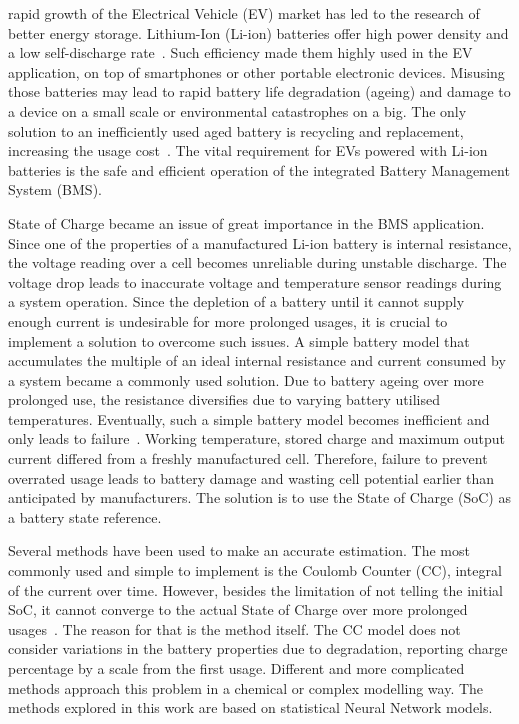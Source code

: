  rapid growth of the Electrical Vehicle (EV) market has led to the research of better energy storage.
Lithium-Ion (Li-ion) batteries offer high power density and a low self-discharge rate~\cite{han_review, en13082106}.
Such efficiency made them highly used in the EV application, on top of smartphones or other portable electronic devices.
Misusing those batteries may lead to rapid battery life degradation (ageing) and damage to a device on a small scale or environmental catastrophes on a big.
The only solution to an inefficiently used aged battery is recycling and replacement, increasing the usage cost~\cite{skeete_beyond_2020}.
The vital requirement for EVs powered with Li-ion batteries is the safe and efficient operation of the integrated Battery Management System (BMS).

%
%
State of Charge became an issue of great importance in the BMS application.
Since one of the properties of a manufactured Li-ion battery is internal resistance, the voltage reading over a cell becomes unreliable during unstable discharge.
The voltage drop leads to inaccurate voltage and temperature sensor readings during a system operation.
Since the depletion of a battery until it cannot supply enough current is undesirable for more prolonged usages, it is crucial to implement a solution to overcome such issues.
A simple battery model that accumulates the multiple of an ideal internal resistance and current consumed by a system became a commonly used solution.
Due to battery ageing over more prolonged use, the resistance diversifies due to varying battery utilised temperatures.
Eventually, such a simple battery model becomes inefficient and only leads to failure~\cite{fenrg.2019.00065}.
Working temperature, stored charge and maximum output current differed from a freshly manufactured cell.
Therefore, failure to prevent overrated usage leads to battery damage and wasting cell potential earlier than anticipated by manufacturers.
The solution is to use the State of Charge (SoC) as a battery state reference.

%
%
Several methods have been used to make an accurate estimation.
The most commonly used and simple to implement is the Coulomb Counter (CC), integral of the current over time.
However, besides the limitation of not telling the initial SoC, it cannot converge to the actual State of Charge over more prolonged usages~\cite{ng_enhanced_2009}.
The reason for that is the method itself.
The CC model does not consider variations in the battery properties due to degradation, reporting charge percentage by a scale from the first usage.
Different and more complicated methods approach this problem in a chemical or complex modelling way.
The methods explored in this work are based on statistical Neural Network models.

